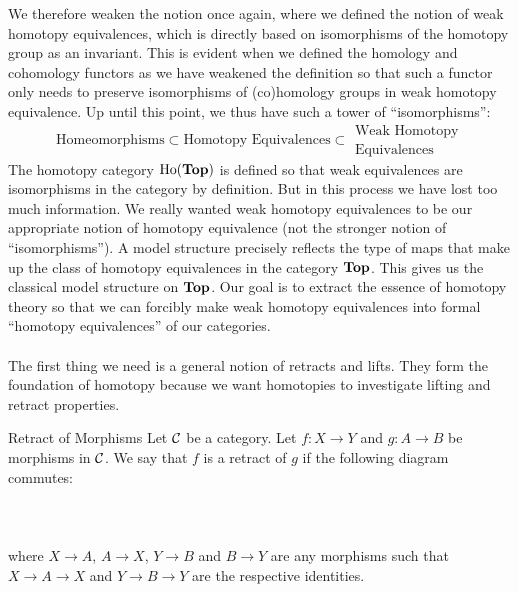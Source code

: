 \documentclass[a4paper]{article}
\begin{document}
We therefore weaken the notion once again, where we defined the notion of weak homotopy equivalences, which is directly based on isomorphisms of the homotopy group as an invariant. This is evident when we defined the homology and cohomology functors as we have weakened the definition so that such a functor only needs to preserve isomorphisms of (co)homology groups in weak homotopy equivalence. Up until this point, we thus have such a tower of ``isomorphisms'': $$\text{Homeomorphisms}\subset\text{Homotopy Equivalences}\subset\substack{\text{Weak Homotopy}\\\text{Equivalences}}$$ The homotopy category $\text{Ho}(\bold{Top})$ is defined so that weak equivalences are isomorphisms in the category by definition. But in this process we have lost too much information. We really wanted weak homotopy equivalences to be our appropriate notion of homotopy equivalence (not the stronger notion of ``isomorphisms''). A model structure precisely reflects the type of maps that make up the class of homotopy equivalences in the category $\bold{Top}$. This gives us the classical model structure on $\bold{Top}$. Our goal is to extract the essence of homotopy theory so that we can forcibly make weak homotopy equivalences into formal ``homotopy equivalences'' of our categories. \\~\\

The first thing we need is a general notion of retracts and lifts. They form the foundation of homotopy because we want homotopies to investigate lifting and retract properties. 

\begin{defn}{Retract of Morphisms}{} Let $\mathcal{C}$ be a category. Let $f:X\to Y$ and $g:A\to B$ be morphisms in $\mathcal{C}$. We say that $f$ is a retract of $g$ if the following diagram commutes: \\~\\
\\~\\
where $X\to A$, $A\to X$, $Y\to B$ and $B\to Y$ are any morphisms such that $X\to A\to X$ and $Y\to B\to Y$ are the respective identities. 
\end{defn}
\end{document}

